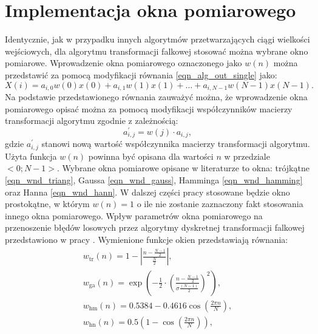 \section{Implementacja okna pomiarowego}

Identycznie, jak w przypadku innych algorytmów przetwarzających ciągi wielkości wejściowych, dla algorytmu transformacji falkowej stosować można wybrane okno pomiarowe. Wprowadzenie okna pomiarowego oznaczonego jako $w(n)$ można przedstawić za pomocą modyfikacji równania \eqref{eqn_alg_out_single} jako:
\begin{equation}
X \left( i \right) = a_{i, 0} w \left( 0 \right) x \left( 0 \right) + a_{i, 1} w \left( 1 \right) x \left( 1 \right) + \hdots + a_{i, N-1} w \left( N-1 \right) x \left( N-1 \right) \label{eqn_wt_singlewindow}.
\end{equation}
Na podstawie przedstawionego równania zauważyć można, że wprowadzenie okna pomiarowego opisać można za pomocą modyfikacji współczynników macierzy transformacji algorytmu zgodnie z zależnością:
\begin{equation}
a_{i,j}^{'} = w \left( j \right) \cdot a_{i,j} \label{eqn_wt_windowmod},
\end{equation}
gdzie $a_{i,j}^{'}$ stanowi nową wartość współczynnika macierzy transformacji algorytmu. Użyta funkcja $w(n)$ powinna być opisana dla wartości $n$ w przedziale $<0;N-1>$. Wybrane okna pomiarowe opisane w literaturze \cite{oppenheim_dsp} to okna: trójkątne \eqref{eqn_wnd_triang}, Gaussa \eqref{eqn_wnd_gauss}, Hamminga \eqref{eqn_wnd_hamming} oraz Hanna \eqref{eqn_wnd_hann}. W dalszej części pracy stosowane będzie okno prostokątne, w którym $w(n) = 1$ o ile nie zostanie zaznaczony fakt stosowania innego okna pomiarowego. Wpływ parametrów okna pomiarowego na przenoszenie błędów losowych przez algorytmy dyskretnej transformacji falkowej przedstawiono w pracy \cite{auth_window}. Wymienione funkcje okien przedstawiają równania:
\begin{gather}
w_{\text{tr}} \left( n \right) = 1 - \left| \frac{n - \frac{N-1}{2}}{\frac{N}{2}} \right| \label{eqn_wnd_triang}, \\
w_{\text{ga}} \left( n \right) = \exp \left(-\frac{1}{2} \cdot \left( \frac{n - \frac{N-1}{2}}{\sigma \frac{ \left( N-1 \right)}{2}} \right)^{2} \right) \label{eqn_wnd_gauss}, \\
w_{\text{hm}} \left( n \right) = 0.5384 - 0.4616 \cos \left( \frac{2 \pi n}{N} \right) \label{eqn_wnd_hamming}, \\
w_{\text{hn}} \left( n \right) = 0.5 \left(1 - \cos \left( \frac{2 \pi n}{N} \right) \right) \label{eqn_wnd_hann},
\end{gather}


